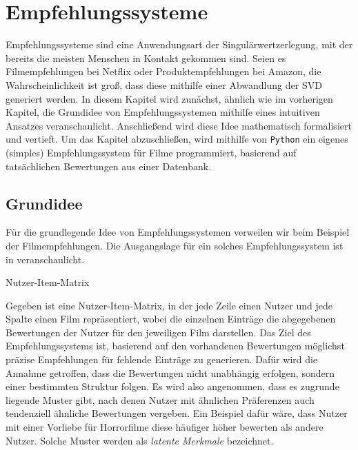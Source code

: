 \chapter{Empfehlungssysteme}\label{chap:rec}

Empfehlungssysteme sind eine Anwendungsart der Singulärwertzerlegung, mit der bereits die meisten Menschen in Kontakt gekommen sind.
Seien es Filmempfehlungen bei Netflix oder Produktempfehlungen bei Amazon, die Wahrscheinlichkeit ist groß, dass diese mithilfe einer Abwandlung der SVD generiert werden.
In diesem Kapitel wird zunächst, ähnlich wie im vorherigen Kapitel, die Grundidee von Empfehlungssystemen mithilfe eines intuitiven Ansatzes veranschaulicht.
Anschließend wird diese Idee mathematisch formalisiert und vertieft.
Um das Kapitel abzuschließen, wird mithilfe von \texttt{Python} ein eigenes (simples) Empfehlungssystem für Filme programmiert, basierend auf tatsächlichen Bewertungen aus einer Datenbank.

\section{Grundidee}

Für die grundlegende Idee von Empfehlungssystemen verweilen wir beim Beispiel der Filmempfehlungen.
Die Ausgangslage für ein solches Empfehlungssystem ist in  veranschaulicht.
\begin{table}[tb]
    \centering
    \caption{Nutzer-Item-Matrix}\label{tab:rec:usit}
    
\end{table}

Gegeben ist eine Nutzer-Item-Matrix, in der jede Zeile einen Nutzer und jede Spalte einen Film repräsentiert, wobei die einzelnen Einträge die abgegebenen Bewertungen der Nutzer für den jeweiligen Film darstellen.
Das Ziel des Empfehlungssystems ist, basierend auf den vorhandenen Bewertungen möglichst präzise Empfehlungen für fehlende Einträge zu generieren.
Dafür wird die Annahme getroffen, dass die Bewertungen nicht unabhängig erfolgen, sondern einer bestimmten Struktur folgen.
Es wird also angenommen, dass es zugrunde liegende Muster gibt, nach denen Nutzer mit ähnlichen Präferenzen auch tendenziell ähnliche Bewertungen vergeben.
Ein Beispiel dafür wäre, dass Nutzer mit einer Vorliebe für Horrorfilme diese häufiger höher bewerten als andere Nutzer.
Solche Muster werden als \emph{latente Merkmale} bezeichnet.

